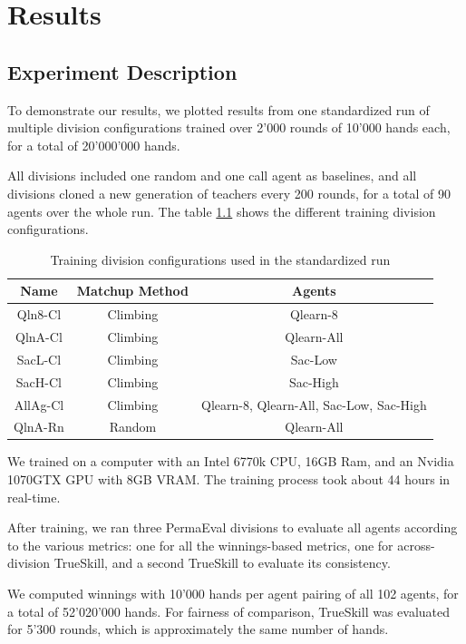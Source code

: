 \chapter{Results}
\label{Results}
\section{Experiment Description}
To demonstrate our results, we plotted results from one standardized run of multiple division configurations trained over 2'000 rounds of 10'000 hands each, for a total of 20'000'000 hands.

All divisions included one random and one call agent as baselines, and all divisions cloned a new generation of teachers every 200 rounds, for a total of 90 agents over the whole run. The table \ref{RunDivisions} shows the different training division configurations.

\begin{table}[h!]
\centering
\begin{tabular}{|| c | c | c ||} 
 \hline
 Name & Matchup Method & Agents \\ [0.5ex] 
 \hline\hline
 Qln8-Cl & Climbing & Qlearn-8 \\
 QlnA-Cl & Climbing & Qlearn-All \\
 SacL-Cl & Climbing & Sac-Low \\
 SacH-Cl & Climbing & Sac-High \\
 AllAg-Cl & Climbing & Qlearn-8, Qlearn-All, Sac-Low, Sac-High \\
 QlnA-Rn & Random & Qlearn-All \\ [1ex] 
 \hline
\end{tabular}
\caption{Training division configurations used in the standardized run}
\label{RunDivisions}
\end{table}

We trained on a computer with an Intel 6770k CPU, 16GB Ram, and an Nvidia 1070GTX GPU with 8GB VRAM. The training process took about 44 hours in real-time.

After training, we ran three PermaEval divisions to evaluate all agents according to the various metrics: one for all the winnings-based metrics, one for across-division TrueSkill, and a second TrueSkill to evaluate its consistency.

We computed winnings with 10'000 hands per agent pairing of all 102 agents, for a total of 52'020'000 hands. For fairness of comparison, TrueSkill was evaluated for 5'300 rounds, which is approximately the same number of hands.


